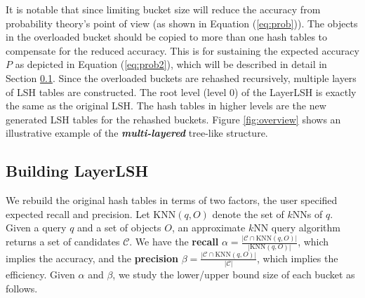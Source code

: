It is notable that since limiting bucket size will reduce the accuracy from probability theory's point of view (as shown in Equation (\ref{eq:prob})). The objects in the overloaded bucket should be copied to more than one hash tables to compensate for the reduced accuracy. This is for sustaining the expected accuracy $P$ as depicted in Equation (\ref{eq:prob2}), which will be described in detail in Section \ref{sec:layerlsh:param}. Since the overloaded buckets are rehashed recursively, multiple layers of LSH tables are constructed. The root level (level 0) of the LayerLSH is exactly the same as the original LSH. The hash tables in higher levels are the new generated LSH tables for the rehashed buckets. Figure \ref{fig:overview} shows an illustrative example of the \emph{\textbf{multi-layered}} tree-like structure.



\subsection{Building LayerLSH}
\label{sec:layerlsh:param}

We rebuild the original hash tables in terms of two factors, the user specified expected recall and precision. Let $\text{KNN}(q,O)$ denote the set of $k$NNs of $q$. Given a query $q$ and a set of objects $O$, an approximate $k$NN query algorithm returns a set of candidates $\mathcal{C}$. We have the \textbf{recall} $\alpha=\frac{|\mathcal{C}\cap \text{KNN}(q,O)|}{|\text{KNN}(q,O)|}$, which implies the accuracy, and the \textbf{precision} $\beta=\frac{|\mathcal{C}\cap \text{KNN}(q,O)|}{|\mathcal{C}|}$, which implies the efficiency. Given $\alpha$ and $\beta$, we study the lower/upper bound size of each bucket as follows.

